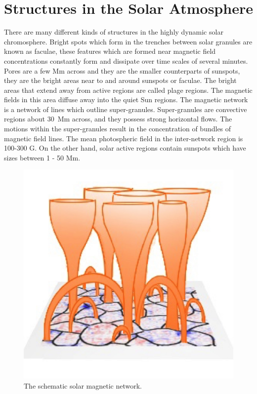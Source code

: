 \documentclass[linenumbers]{aastex63}
\begin{document}
\section{Structures in the Solar Atmosphere} 
\label{sec:structures}


There are many different kinds of structures in the highly dynamic solar chromosphere. Bright spots which form in the trenches between solar granules are known as faculae, these features which are formed near magnetic field concentrations constantly form and dissipate over time scales of several minutes. Pores are a few Mm across and they are the smaller counterparts of sunspots, they are the bright areas near to and around sunspots or faculae. The bright areas that extend away from active regions are called plage regions.  The magnetic fields in this area diffuse away into the quiet Sun regions. The magnetic network is a network of lines which outline super-granules. Super-granules are convective regions about 30~Mm across, and they possess strong horizontal flows. The motions within the super-granules result in the concentration of bundles of magnetic field lines.  The mean photospheric field in the inter-network region is 100-300 G. On the other hand, solar active regions contain sunspots which have sizes between  1 - 50 Mm. 


\begin{figure}[h]\label{magneticnetwork}
\centering
\includegraphics[scale=0.3]{solar-network-v1.jpg}
\caption{The schematic solar magnetic network.}
\end{figure}
\end{document}
